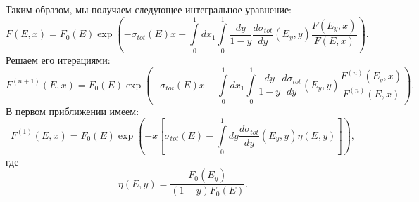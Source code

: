 Таким образом, мы получаем следующее интегральное уравнение: 
\begin{equation}
          F(E, x) = F_0(E)\exp{\left(-\sigma_{tot}(E)x + \int\limits_{0}^1dx_1 \int\limits_{0}^1\frac{dy}{1-y}\frac{d\sigma_{tot}}{dy}(E_y, y)\frac{F(E_y, x)}{F(E,x)}\right)}.
\end{equation}
Решаем его итерациями: 
\begin{equation}
          F^{(n+1)}(E, x) = F_0(E)\exp{\left(-\sigma_{tot}(E)x + \int\limits_{0}^1dx_1 \int\limits_{0}^1\frac{dy}{1-y}\frac{d\sigma_{tot}}{dy}(E_y, y)\frac{F^{(n)}(E_y, x)}{F^{(n)}(E,x)}\right)}.
\end{equation}
В первом приближении имеем: 
\begin{equation}
          F^{(1)}(E, x) = F_0(E)\exp{\left(-x\left[\sigma_{tot}(E) -\int\limits_{0}^1dy\frac{d\sigma_{tot}}{dy}(E_y, y)\eta(E, y)\right]\right)},
\end{equation}
где 
\begin{equation}
    \eta(E,y) = \frac{F_0(E_y)}{(1-y)F_0(E)}.
\end{equation}
